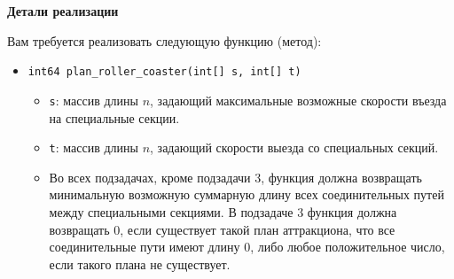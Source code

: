 \textbf{Детали реализации}

Вам требуется реализовать следующую функцию (метод): 
\begin{itemize}
\item \texttt{int64 plan\_roller\_coaster(int[] s, int[] t)}
\begin{itemize}
\item \texttt{s}: массив длины $n$, задающий максимальные возможные скорости въезда на специальные секции.
\item \texttt{t}: массив длины $n$, задающий скорости выезда со специальных секций.
\item Во всех подзадачах, кроме подзадачи 3, функция должна возвращать минимальную возможную суммарную длину всех соединительных путей между специальными секциями. В подзадаче 3 функция должна возвращать $0$, если существует такой план аттракциона, что все соединительные пути имеют длину $0$, либо любое положительное число, если такого плана не существует.
\end{itemize}
\end{itemize}
